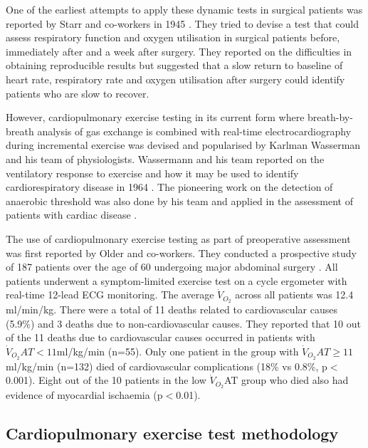 One of the earliest attempts to apply these dynamic tests in surgical patients was reported by Starr and co-workers in 1945 \parencite{starr_convalescence_1945}.
They tried to devise a test that could assess respiratory function and oxygen utilisation in surgical patients before, immediately after and a week after surgery. 
They reported on the difficulties in obtaining reproducible results but suggested that a slow return to baseline of heart rate, respiratory rate and oxygen utilisation after surgery could identify patients who are slow to recover. 

However, cardiopulmonary exercise testing in its current form where breath-by-breath analysis of gas exchange is combined with real-time electrocardiography during incremental exercise was devised and popularised by Karlman Wasserman and his team of physiologists.
Wassermann and his team reported on the ventilatory response to exercise and how it may be used to identify cardiorespiratory disease in 1964 \parencite{naimark_continuous_1964}.
The pioneering work on the detection of anaerobic threshold was also done by his team and applied in the assessment of patients with cardiac disease \parencite{wasserman_detecting_1964, wasserman_lactate_1967, wasserma.k_anaerobic_1973}.

The use of cardiopulmonary exercise testing as part of preoperative assessment was first reported by Older and co-workers.
They conducted a prospective study of 187 patients over the age of 60 undergoing major abdominal surgery  \parencite{older_preoperative_1993}. 
All patients underwent a symptom-limited exercise test on a cycle ergometer with real-time 12-lead ECG monitoring. 
The average $\dot{V}_{O_2}$ across all patients was 12.4 ml/min/kg. 
There were a total of 11 deaths related to cardiovascular causes (5.9\%) and 3 deaths due to non-cardiovascular causes. 
They reported that 10 out of the 11 deaths due to cardiovascular causes occurred in patients with $\dot{V}_{O_2}AT<11$ml/kg/min (n=55).
Only one patient in the group with $\dot{V}_{O_2}AT\geq11$ml/kg/min (n=132) died of cardiovascular complications (18\% vs 0.8\%, p$<$0.001). 
Eight out of the 10 patients in the low $\dot{V}_{O_2}$AT group who died also had evidence of myocardial ischaemia (p$<$0.01). 


\subsection{Cardiopulmonary exercise test methodology}
\label{sec:cpx_method}

